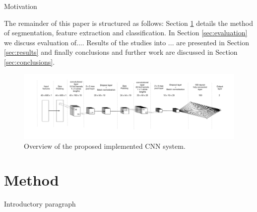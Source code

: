\documentclass{article}
\begin{document}
{Motivation


The remainder of this paper is structured as follows: Section \ref{sec:method}  details the method of segmentation, feature extraction and classification. In Section \ref{sec:evaluation} we discuss evaluation of.... Results of the studies into ... are presented in Section \ref{sec:results} and finally conclusions and further work are discussed in Section \ref{sec:conclusions}.

\begin{figure}[t]
\includegraphics[width=1\textwidth]{figs/CNNDiagramPD}
\caption{Overview of the proposed implemented CNN system.}
\label{CNNDiagram}
\end{figure}

\section{Method} \label{sec:method}

Introductory paragraph


%
%
%
%



}
\end{document}
